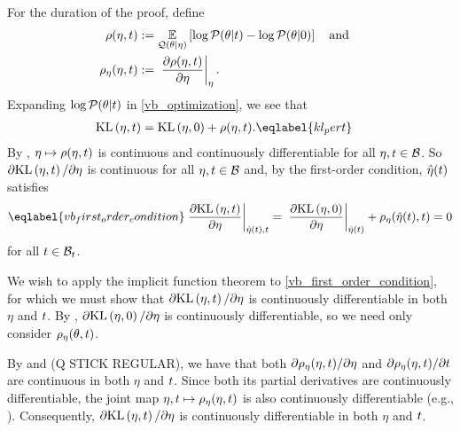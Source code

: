 %
For the duration of the proof, define
%
\begin{align*}
%
\rho(\eta, \t) :={}&
    \expect{\q(\theta \vert \eta)}
           {\log \p(\theta \vert \t) - \log \p(\theta \vert 0)}
\mathand\\
\rho_\eta(\eta, \t) :={}&
\fracat{\partial \rho(\eta, \t)}
       {\partial \eta}{\eta}.
%
\end{align*}
%
Expanding $\log \mathcal{P}(\theta \vert t)$ in \eqref{vb_optimization}, we see that
%
\begin{align}
%
\KL{\eta, \t} ={}&
    \KL{\eta, 0} + \rho(\eta, \t). \eqlabel{kl_pert}
%
\end{align}
%
%
By , $\eta \mapsto \rho(\eta, t)$ is continuous and
continuously differentiable for all $\eta, t \in \mathcal{B}$.  So $\partial
\mathrm{KL}\left(\eta, t\right)  / \partial \eta$ is continuous for all $\eta, t \in \mathcal{B}$ and,
by the first-order condition, $\hat\eta(t)$ satisfies
%
\begin{align}\eqlabel{vb_first_order_condition}
%
\fracat{\partial \KL{\eta, \t}}{ \partial \eta}{\etaopt(\t), \t} ={}
\fracat{\partial \KL{\eta, 0}}{ \partial \eta}{\etaopt(\t)}
+  \rho_\eta(\etaopt(\t), \t) ={} 0
%
\end{align}
%
for all $t \in \mathcal{B}_t$.

We wish to apply the implicit function theorem to
\eqref{vb_first_order_condition}, for which we must show that $\partial
\mathrm{KL}\left(\eta, t\right) / \partial \eta$ is continuously differentiable in both $\eta$ and
$t$.  By , $\partial \mathrm{KL}\left(\eta, 0\right) /
\partial \eta$ is continuously differentiable, so we need only consider
$\rho_\eta(\theta, t)$.

By  and (Q STICK REGULAR), we
have that both $\partial \rho_\eta(\eta, t) / \partial \eta$ and $\partial
\rho_\eta(\eta, t) / \partial t$ are continuous in both $\eta$ and $t$.
Since both its partial derivatives are continuously differentiable, the joint
map $\eta, t \mapsto \rho_\eta(\eta, t)$ is also continuously differentiable
(e.g., \citet[Theorem 3.2]{fleming:2012:functions}).  Consequently, $\partial
\mathrm{KL}\left(\eta, t\right) / \partial \eta$ is continuously differentiable in both $\eta$ and
$t$.


